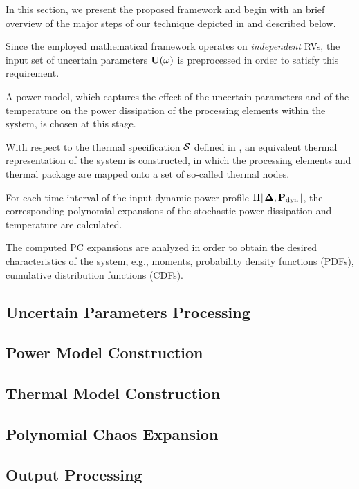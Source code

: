 In this section, we present the proposed framework and begin with an brief overview of the major steps of our technique depicted in  and described below.

 Since the employed mathematical framework operates on \emph{independent} RVs, the input set of uncertain parameters $\mathbf{U}(\omega)$ is preprocessed in order to satisfy this requirement.

 A power model, which captures the effect of the uncertain parameters and of the temperature on the power dissipation of the processing elements within the system, is chosen at this stage.

 With respect to the thermal specification $\mathcal{S}$ defined in , an equivalent thermal representation of the system is constructed, in which the processing elements and thermal package are mapped onto a set of so-called thermal nodes.

 For each time interval of the input dynamic power profile $\profPdyn$, the corresponding polynomial expansions of the stochastic power dissipation and temperature are calculated.

 The computed PC expansions are analyzed in order to obtain the desired characteristics of the system, e.g., moments, probability density functions (PDFs), cumulative distribution functions (CDFs).

\subsection{Uncertain Parameters Processing} 


\subsection{Power Model Construction} 


\subsection{Thermal Model Construction} 


\subsection{Polynomial Chaos Expansion} 


\subsection{Output Processing} 

